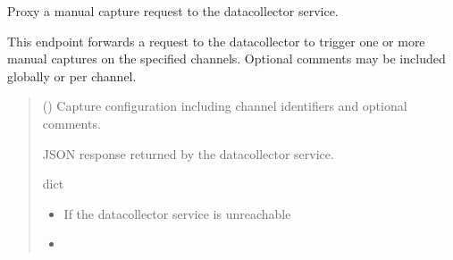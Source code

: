 \documentclass[letterpaper,10pt,english]{sphinxmanual}
\begin{document}
\begin{fulllineitems}
\label{\detokenize{modules/src.pig_sorting_api.main:src.pig_sorting_api.main.capture}}
\pysigstartsignatures
\pysiglinewithargsret
{}
{}
{}
\pysigstopsignatures
\sphinxAtStartPar
Proxy a manual capture request to the data\sphinxhyphen{}collector service.

\sphinxAtStartPar
This endpoint forwards a request to the data\sphinxhyphen{}collector to trigger
one or more manual captures on the specified channels. Optional
comments may be included globally or per channel.
\begin{quote}\begin{description}
\sphinxAtStartPar
{} ({\hyperref[\detokenize{modules/src.pig_sorting_api.main:src.pig_sorting_api.main.CaptureRequest}]{}}) \textendash{} Capture configuration including
channel identifiers and optional comments.

\sphinxAtStartPar
JSON response returned by the data\sphinxhyphen{}collector service.

\sphinxAtStartPar
dict

\begin{itemize}
\item {} 
\sphinxAtStartPar
{} \textendash{} If the data\sphinxhyphen{}collector service is unreachable

\item {} 
\sphinxAtStartPar
{} \textendash{} 

\end{itemize}

\end{description}\end{quote}

\end{fulllineitems}

\end{document}

